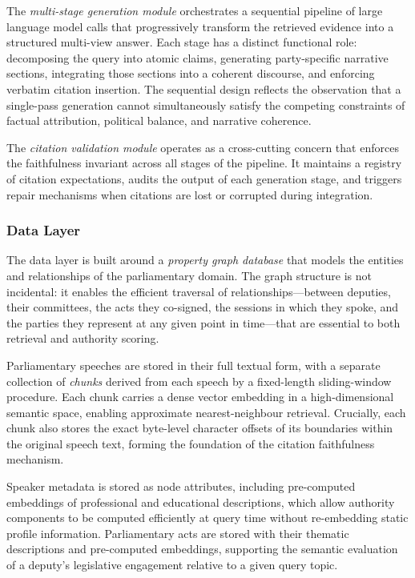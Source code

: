 The \textit{multi-stage generation module} orchestrates a sequential pipeline of
large language model calls that progressively transform the retrieved evidence into a
structured multi-view answer. Each stage has a distinct functional role: decomposing the
query into atomic claims, generating party-specific narrative sections, integrating those
sections into a coherent discourse, and enforcing verbatim citation insertion. The
sequential design reflects the observation that a single-pass generation cannot
simultaneously satisfy the competing constraints of factual attribution, political
balance, and narrative coherence.

The \textit{citation validation module} operates as a cross-cutting concern that enforces
the faithfulness invariant across all stages of the pipeline. It maintains a registry of
citation expectations, audits the output of each generation stage, and triggers repair
mechanisms when citations are lost or corrupted during integration.

\subsubsection{Data Layer}

The data layer is built around a \textit{property graph database} that models the entities
and relationships of the parliamentary domain. The graph structure is not incidental: it
enables the efficient traversal of relationships---between deputies, their committees, the
acts they co-signed, the sessions in which they spoke, and the parties they represent at
any given point in time---that are essential to both retrieval and authority scoring.

Parliamentary speeches are stored in their full textual form, with a separate collection of
\textit{chunks} derived from each speech by a fixed-length sliding-window procedure. Each
chunk carries a dense vector embedding in a high-dimensional semantic space, enabling
approximate nearest-neighbour retrieval. Crucially, each chunk also stores the exact
byte-level character offsets of its boundaries within the original speech text, forming
the foundation of the citation faithfulness mechanism.

Speaker metadata is stored as node attributes, including pre-computed embeddings of
professional and educational descriptions, which allow authority components to be computed
efficiently at query time without re-embedding static profile information. Parliamentary
acts are stored with their thematic descriptions and pre-computed embeddings, supporting
the semantic evaluation of a deputy's legislative engagement relative to a given query
topic.

